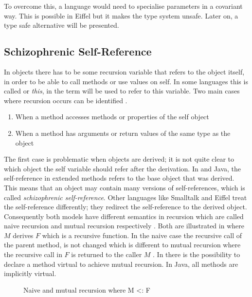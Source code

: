 To overcome this, a language would need to specialise parameters in a
covariant way. This is possible in Eiffel but it makes the type system
unsafe. Later on, a type safe alternative will be presented.

\subsection{Schizophrenic Self-Reference}
\label{sec:schizoReferences}
In objects there has to be some recursion variable that refers to the
object itself, in order to be able to call methods or use values on self. In some
languages this is called \self or \emph{this}, in \ooplss
the term \self will be used to refer to this variable. Two main cases where
recursion occurs can be identified \cite{simons_theory_2003-2}.

\begin{enumerate}
	\item When a method accesses methods or properties of the self object
	\item When a method has arguments or return values of the same type as the object
\end{enumerate}

The first case is problematic when objects are derived; it is not
quite clear to which object the self variable should refer after
the derivation. In \cpp and Java, the self-reference in extended
methods refers to the base object that was derived. This means that an
object may contain many versions of self-references, which is called
\emph{schizophrenic self-reference}. Other languages like Smalltalk
and Eiffel treat the self-reference differently; they redirect the
self-reference to the derived object. Consequently both models have
different semantics in recursion which are called naive recursion 
and mutual recursion respectively \cite{cook_denotational_1989}. Both are illustrated
in  where $M$ derives $F$ which is a recursive
function. In the naive case the recursive call of the parent method,
is not changed which is different to mutual recursion where the recursive
call in $F$ is returned to the caller $M$ \cite{simons_theory_2003-2}.
In \cpp there is the possibility to declare a method virtual to achieve
mutual recursion. In Java, all methods are implicitly virtual.

\begin{figure}[H]
	\centering
	\caption[Naive and mutual recursion where M <: F]{Naive and mutual recursion where M <: F \cite{cook_denotational_1989}}
	\label{fig:schizoRecursion}
\end{figure}

